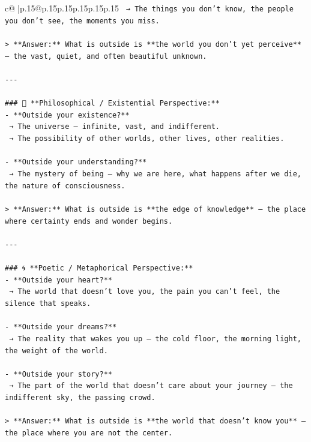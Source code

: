 \documentclass{article}
\begin{document}
{\begin{supertabular}{c@{$\;$}|p{.15\linewidth}@{}p{.15\linewidth}p{.15\linewidth}p{.15\linewidth}p{.15\linewidth}p{.15\linewidth}}
{{{\texttt{  → The things you don’t know, the people you don’t see, the moments you miss.} \\
\\ 
\texttt{> **Answer:** What is outside is **the world you don’t yet perceive** — the vast, quiet, and often beautiful unknown.} \\
\\ 
\texttt{{-}{-}{-}} \\
\\ 
\texttt{\#\#\# 🌌 **Philosophical / Existential Perspective:**} \\
\texttt{{-} **Outside your existence?**  } \\
\texttt{  → The universe — infinite, vast, and indifferent.  } \\
\texttt{  → The possibility of other worlds, other lives, other realities.} \\
\\ 
\texttt{{-} **Outside your understanding?**  } \\
\texttt{  → The mystery of being — why we are here, what happens after we die, the nature of consciousness.} \\
\\ 
\texttt{> **Answer:** What is outside is **the edge of knowledge** — the place where certainty ends and wonder begins.} \\
\\ 
\texttt{{-}{-}{-}} \\
\\ 
\texttt{\#\#\# 🌀 **Poetic / Metaphorical Perspective:**} \\
\texttt{{-} **Outside your heart?**  } \\
\texttt{  → The world that doesn’t love you, the pain you can’t feel, the silence that speaks.} \\
\\ 
\texttt{{-} **Outside your dreams?**  } \\
\texttt{  → The reality that wakes you up — the cold floor, the morning light, the weight of the world.} \\
\\ 
\texttt{{-} **Outside your story?**  } \\
\texttt{  → The part of the world that doesn’t care about your journey — the indifferent sky, the passing crowd.} \\
\\ 
\texttt{> **Answer:** What is outside is **the world that doesn’t know you** — the place where you are not the center.} \\
}}}
\end{supertabular}}
\end{document}
